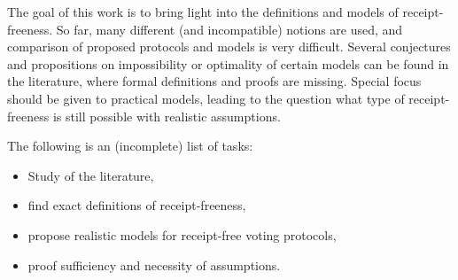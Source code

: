 \documentclass[E]{DASA}
\begin{document}
\desc

The goal of this work is to bring light into the definitions and models of
receipt-freeness. So far, many different (and incompatible) notions are
used, and comparison of proposed protocols and models is very difficult.
Several conjectures and propositions on impossibility or optimality of
certain models can be found in the literature, where formal definitions and
proofs are missing. Special focus should be given to practical models,
leading to the question what type of receipt-freeness is still possible
with realistic assumptions.


\tasks

The following is an (incomplete) list of tasks:
\begin{itemize}
  \item Study of the literature,
  \item find exact definitions of receipt-freeness,
  \item propose realistic models for receipt-free voting protocols,
  \item proof sufficiency and necessity of assumptions.
\end{itemize}

\blah



\end{document}
